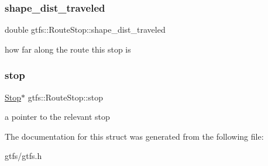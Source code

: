 \subsubsection{\texorpdfstring{shape\+\_\+dist\+\_\+traveled}{shape\_dist\_traveled}}
{\footnotesize\ttfamily double gtfs\+::\+Route\+Stop\+::shape\+\_\+dist\+\_\+traveled}

how far along the route this stop is \mbox{\label{structgtfs_1_1RouteStop_ae14c110356572344748f08c07fea1b0c}} 
\subsubsection{\texorpdfstring{stop}{stop}}
{\footnotesize\ttfamily \hyperlink{classgtfs_1_1Stop}{Stop}$\ast$ gtfs\+::\+Route\+Stop\+::stop}

a pointer to the relevant stop 

The documentation for this struct was generated from the following file\+:\begin{DoxyCompactItemize}
\item 
gtfs/gtfs.\+h\end{DoxyCompactItemize}
